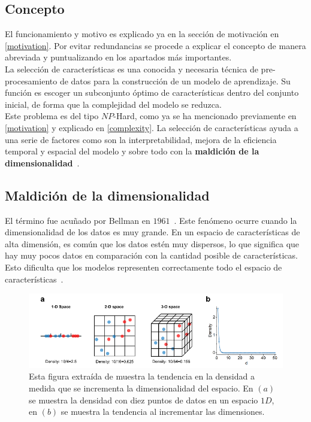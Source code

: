 \subsection{Concepto}
El funcionamiento y motivo es explicado ya en la sección de motivación en \ref{motivation}. Por evitar redundancias se procede a explicar el concepto de manera abreviada y puntualizando en los apartados más importantes.\\[6pt]
La selección de características es una conocida y necesaria técnica de pre-procesamiento de datos para la construcción de un modelo de aprendizaje. Su función es escoger un subconjunto óptimo de características dentro del conjunto inicial, de forma que la complejidad del modelo se reduzca.\\[6pt]
Este problema es del tipo $NP$-Hard, como ya se ha mencionado previamente en \ref{motivation} y explicado en \ref{complexity}.
La selección de características ayuda a una serie de factores como son la interpretabilidad, mejora de la eficiencia temporal y espacial del modelo y sobre todo con la \textbf{maldición de la dimensionalidad}~\cite{venkat2018curse, bellman1957dynamic}.

\subsection{Maldición de la dimensionalidad}
El término fue acuñado por Bellman en $1961$~\cite{bellman1961adaptive}. Este fenómeno ocurre cuando la dimensionalidad de los datos es muy grande. En un espacio de características de alta dimensión, es común que los datos estén muy dispersos, lo que significa que hay muy pocos datos en comparación con la cantidad posible de características. Esto dificulta que los modelos representen correctamente todo el espacio de características~\cite{peng_interpreting_2024}.

\begin{figure}[H]
    \begin{center}
        \includegraphics[width=1\textwidth]{imagenes/curse-dimen-example.png}
    \end{center}
    \caption[Tendencia de incremento de dimensionalidad en varios espacios de características]{Esta figura extraída de \cite{peng_interpreting_2024} muestra la tendencia en la densidad a medida que se incrementa la dimensionalidad del espacio. En $(a)$ se muestra la densidad con diez puntos de datos en un espacio $1D$, en $(b)$ se muestra la tendencia al incrementar las dimensiones.}
\end{figure}

